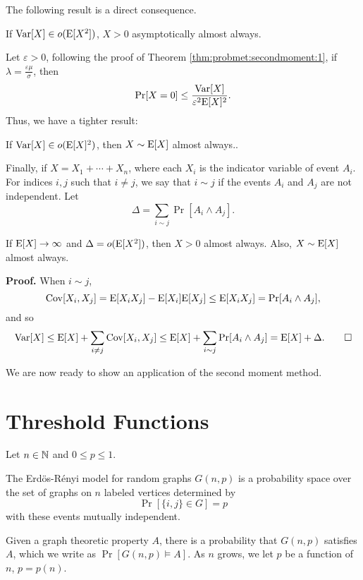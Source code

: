 The following result is a direct consequence. 

\begin{corollary}\label{cor:probmet:secondmoment:1}
    If $\mathrm{Var}[X] \in o(\mathrm{E}[X^2])$, $X > 0$ asymptotically almost always. 
\end{corollary}

Let $\varepsilon > 0$, following the proof of Theorem \ref{thm:probmet:secondmoment:1}, if $\lambda = \frac{\varepsilon\mu}{\sigma}$, then
\[\mathrm{Pr}[X = 0] \leq \frac{\mathrm{Var}[X]}{\varepsilon^2\mathrm{E}[X]^2}.\]
Thus, we have a tighter result:
\begin{corollary}\label{cor:probmet:secondmoment:2}
    If $\mathrm{Var}[X] \in o(\mathrm{E}[X]^2)$, then $X \sim \mathrm{E}[X]$ almost always.. 
\end{corollary}

Finally, if $X = X_1 + \cdots + X_n$, where each $X_i$ is the indicator variable of event $A_i$. For indices $i, j$ such that $i \neq j$, we say that $i \sim j$ if the events $A_i$ and $A_j$ are not independent. Let
\[\Delta  = \sum_{i \sim j} \Pr[A_i \wedge A_j].\]
\begin{corollary}\label{cor:probmet:secondmoment:3}
    If $\mathrm{E}[X] \to \infty$ and $\Delta = o(\mathrm{E}[X^2])$, then $X > 0$ almost always. Also, $X \sim \mathrm{E}[X]$ almost always.
\end{corollary}
\textbf{Proof. } When $i \sim j$, 
\[\mathrm{Cov}[X_i, X_j] = \mathrm{E}[X_iX_j] - \mathrm{E}[X_i]\mathrm{E}[X_j] \leq \mathrm{E}[X_iX_j] = \mathrm{Pr}[A_i \wedge A_j],\]
and so 
\[\mathrm{Var}[X] \leq \mathrm{E}[X] + \sum_{i \neq j}\mathrm{Cov}[X_i, X_j] \leq \mathrm{E}[X] + \sum_{i \sim j}\mathrm{Pr}[A_i \wedge A_j] = \mathrm{E}[X] + \Delta. \qed\]

We are now ready to show an application of the second moment method. \par
\section{Threshold Functions}\label{sec:probmet:threshold}

Let $n \in \mathbb{N}$ and $0 \leq p \leq 1$. 
\begin{definition}\label{def:probmet:ermodel}
    The Erdös-Rényi model for random graphs $G(n, p)$ is a probability space over the set of graphs on $n$ labeled vertices determined by
    \[\Pr[\{i, j\} \in G] = p\] 
    with these events mutually independent.
\end{definition}
 Given a graph theoretic property $A$, there is a probability that $G(n, p)$ satisfies $A$, which we write as $\Pr[G(n, p) \vDash A]$. As $n$ grows, we let $p$ be a function of $n$, $p = p(n)$. \par

